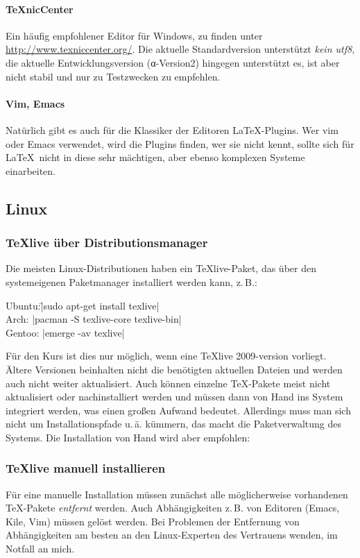 \documentclass[12pt,ngerman]{scrartcl}
\newcommand{\TeXlive}{\TeX\textsf{live}\xspace}
\begin{document}
\paragraph{TeXnicCenter}
Ein häufig empfohlener Editor für Windows, zu finden unter \url{http://www.texniccenter.org/}. Die aktuelle Standardversion unterstützt \emph{kein utf8}, die aktuelle Entwicklungsversion (α-Version2) hingegen unterstützt es, ist aber nicht stabil und nur zu Testzwecken zu empfehlen.

\paragraph{Vim, Emacs}
Natürlich gibt es auch für die Klassiker der Editoren \LaTeX-Plugins. Wer vim oder Emacs verwendet, wird die Plugins finden, wer sie nicht kennt, sollte sich für \LaTeX\ nicht in diese sehr mächtigen, aber ebenso komplexen Systeme einarbeiten.

\subsection{Linux}
\subsubsection{\TeX\textbf{\textsf{live}} über Distributionsmanager}
Die meisten Linux-Distributionen haben ein \TeXlive-Paket, das über den systemeigenen Paketmanager installiert werden kann, z.\,B.:

\begin{tabbing}
Ubuntu:\quad \= |sudo apt-get install texlive|\\
Arch: \> |pacman -S texlive-core texlive-bin|\\
Gentoo: \> |emerge -av texlive|\\
\end{tabbing}

Für den Kurs ist dies nur möglich, wenn eine \TeXlive 2009-version vorliegt. Ältere Versionen beinhalten nicht die benötigten aktuellen Dateien und werden auch nicht weiter aktualisiert. Auch können einzelne \TeX-Pakete meist nicht aktualisiert oder nachinstalliert werden und müssen dann von Hand ins System integriert werden, was einen großen Aufwand bedeutet. Allerdings muss man sich nicht um Installationspfade u.\,ä. kümmern, das macht die Paketverwaltung des Systems. Die Installation von Hand wird aber empfohlen:

\subsubsection{\TeX\textbf{\textsf{live}} manuell installieren}
Für eine manuelle Installation müssen zunächst alle möglicherweise vorhandenen \TeX-Pakete \emph{entfernt} werden. Auch Abhängigkeiten z.\,B. von Editoren (Emacs, Kile, Vim) müssen gelöst werden. Bei Problemen der Entfernung von Abhängigkeiten am besten an den Linux-Experten des Vertrauens wenden, im Notfall an mich.
\end{document}
